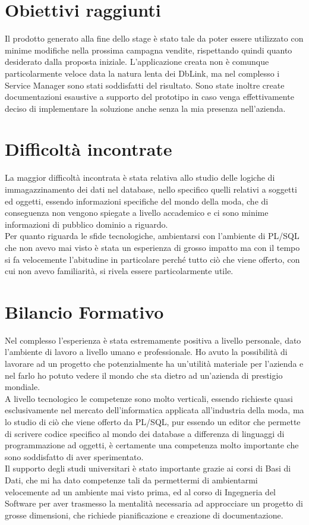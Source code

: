 \section{Obiettivi raggiunti}
Il prodotto generato alla fine dello stage è stato tale da poter essere utilizzato con minime modifiche nella prossima campagna vendite, rispettando quindi quanto desiderato dalla proposta iniziale.
L'applicazione creata non è comunque particolarmente veloce data la natura lenta dei DbLink, ma nel complesso i Service Manager sono stati soddisfatti del risultato. Sono state inoltre create documentazioni esaustive a supporto del prototipo in caso venga effettivamente deciso di implementare la soluzione anche senza la mia presenza nell'azienda.\\

\section{Difficoltà incontrate}
La maggior difficoltà incontrata è stata relativa allo studio delle logiche di immagazzinamento dei dati nel database, nello specifico quelli relativi a soggetti ed oggetti, essendo informazioni specifiche del mondo della moda, che di conseguenza non vengono spiegate a livello accademico e ci sono minime informazioni di pubblico dominio a riguardo.\\
Per quanto riguarda le sfide tecnologiche, ambientarsi con l'ambiente di PL/SQL che non avevo mai visto è stata un esperienza di grosso impatto ma con il tempo si fa velocemente l'abitudine in particolare perché tutto ciò che viene offerto, con cui non avevo familiarità, si rivela essere particolarmente utile. 

\section{Bilancio Formativo}
Nel complesso l'esperienza è stata estremamente positiva a livello personale, dato l'ambiente di lavoro a livello umano e professionale. Ho avuto la possibilità di lavorare ad un progetto che potenzialmente ha un'utilità materiale per l'azienda e nel farlo ho potuto vedere il mondo che sta dietro ad un'azienda di prestigio mondiale.\\
A livello tecnologico le competenze sono molto verticali, essendo richieste quasi esclusivamente nel mercato dell'informatica applicata all'industria della moda, ma lo studio di ciò che viene offerto da PL/SQL, pur essendo un editor che permette di scrivere codice specifico al mondo dei database a differenza di linguaggi di programmazione ad oggetti, è certamente una competenza molto importante che sono soddisfatto di aver sperimentato.\\
Il supporto degli studi universitari è stato importante grazie ai corsi di Basi di Dati, che mi ha dato competenze tali da permettermi di ambientarmi velocemente ad un ambiente mai visto prima, ed al corso di Ingegneria del Software per aver trasmesso la mentalità necessaria ad approcciare un progetto di grosse dimensioni, che richiede pianificazione e creazione di documentazione.